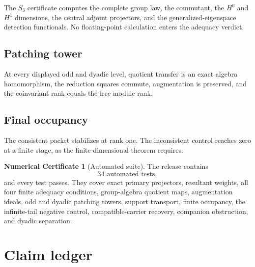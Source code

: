 \documentclass[11pt]{article}
\theoremstyle{definition}
\newtheorem{numericalcertificate}[theorem]{Numerical Certificate}
\theoremstyle{remark}
\begin{document}
\begin{center}

\end{center}

\begin{center}

\end{center}

The $S_3$ certificate computes the complete group law, the commutant, the $H^0$ and $H^1$ dimensions, the central adjoint projectors, and the generalized-eigenspace detection functionals.  No floating-point calculation enters the adequacy verdict.

\subsection{Patching tower}

\begin{center}
\resizebox{0.88\linewidth}{!}{}
\end{center}

At every displayed odd and dyadic level, quotient transfer is an exact algebra homomorphism, the reduction squares commute, augmentation is preserved, and the coinvariant rank equals the free module rank.

\subsection{Final occupancy}

\begin{center}

\end{center}

The consistent packet stabilizes at rank one.  The inconsistent control reaches zero at a finite stage, as the finite-dimensional theorem requires.

\begin{numericalcertificate}[Automated suite]
The release contains
\[
\boxed{34\text{ automated tests},}
\]
and every test passes.  They cover exact primary projectors, resultant weights, all four finite adequacy conditions, group-algebra quotient maps, augmentation ideals, odd and dyadic patching towers, support transport, finite occupancy, the infinite-tail negative control, compatible-carrier recovery, companion obstruction, and dyadic separation.
\end{numericalcertificate}

\section{Claim ledger}
\end{document}
